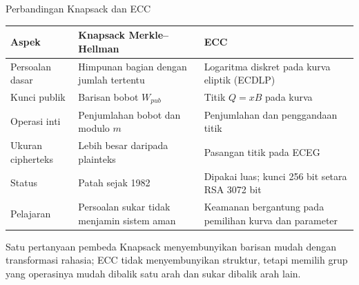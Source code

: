 \documentclass[aspectratio=169,11pt]{beamer}
\begin{document}
\begin{frame}{Perbandingan Knapsack dan ECC}
    \scriptsize
    \begin{tabularx}{\linewidth}{@{}>{\raggedright\arraybackslash}p{2.8cm} >{\raggedright\arraybackslash}p{4.5cm} >{\raggedright\arraybackslash}X@{}}
        \toprule
        \textbf{Aspek} & \textbf{Knapsack Merkle--Hellman} & \textbf{ECC} \\
        \midrule
        Persoalan dasar & Himpunan bagian dengan jumlah tertentu & Logaritma diskret pada kurva eliptik (ECDLP) \\
        \addlinespace[1pt]
        Kunci publik & Barisan bobot $W_{pub}$ & Titik $Q=xB$ pada kurva \\
        \addlinespace[1pt]
        Operasi inti & Penjumlahan bobot dan modulo $m$ & Penjumlahan dan penggandaan titik \\
        \addlinespace[1pt]
        Ukuran cipherteks & Lebih besar daripada plainteks & Pasangan titik pada ECEG \\
        \addlinespace[1pt]
        Status & Patah sejak 1982 & Dipakai luas; kunci 256 bit setara RSA 3072 bit \\
        \addlinespace[1pt]
        Pelajaran & Persoalan sukar tidak menjamin sistem aman & Keamanan bergantung pada pemilihan kurva dan parameter \\
        \bottomrule
    \end{tabularx}
    \vspace{0.12cm}
    \begin{alertblock}{Satu pertanyaan pembeda}
        \footnotesize
        Knapsack menyembunyikan barisan mudah dengan transformasi rahasia;
        ECC tidak menyembunyikan struktur, tetapi memilih grup yang operasinya
        mudah dibalik satu arah dan sukar dibalik arah lain.
    \end{alertblock}
\end{frame}
\end{document}
